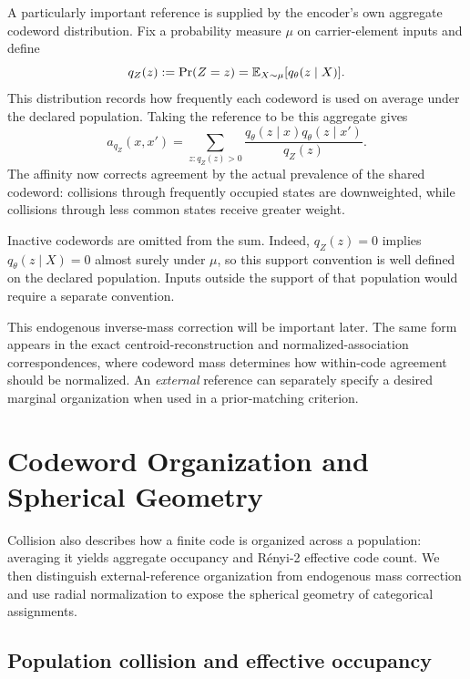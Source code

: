 A particularly important reference is supplied by the encoder's own aggregate codeword distribution.
Fix a probability measure $\mu$ on carrier-element inputs and define
\begin{equation}
q_Z(z)
:=\Pr(Z=z)
=\mathbb{E}_{X\sim\mu}[q_\theta(z\mid X)].
\label{eq:aggregate-code}
\end{equation}
This distribution records how frequently each codeword is used on average under the declared population.
Taking the reference to be this aggregate gives
\begin{equation}
a_{q_Z}(x,x')
=\sum_{z:q_Z(z)>0}\frac{q_\theta(z\mid x)q_\theta(z\mid x')}{q_Z(z)}.
\label{eq:qz-affinity}
\end{equation}
The affinity now corrects agreement by the actual prevalence of the shared codeword: collisions through frequently occupied states are downweighted, while collisions through less common states receive greater weight.

Inactive codewords are omitted from the sum.
Indeed, $q_Z(z)=0$ implies
$q_\theta(z\mid X)=0$ almost surely under $\mu$, so this support convention is well defined on the declared population.
Inputs outside the support of that population would require a separate convention.

This endogenous inverse-mass correction will be important later.
The same form appears in the exact centroid-reconstruction and normalized-association correspondences, where codeword mass determines how within-code agreement should be normalized.
An \emph{external} reference can separately specify a desired marginal organization when used in a prior-matching criterion.

\section{Codeword Organization and Spherical Geometry}
\label{sec:collision-entropy}

Collision also describes how a finite code is organized across a population: averaging it yields aggregate occupancy and R\'enyi-2 effective code count.
We then distinguish external-reference organization from endogenous mass correction and use radial normalization to expose the spherical geometry of categorical assignments.

\subsection{Population collision and effective occupancy}

